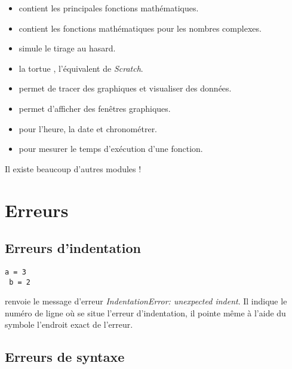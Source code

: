 \documentclass[11pt,class=report,crop=false]{standalone}
\begin{document}
\begin{itemize}
  \item {} \quad contient les principales fonctions mathématiques. 
  \item {} \quad contient les fonctions mathématiques pour les nombres complexes. 
  \item {} \quad simule le tirage au hasard.
  \item {} \quad la tortue \Python, l'équivalent de \emph{Scratch}.
  \item {} \quad permet de tracer des graphiques et visualiser des données.
  \item {} \quad permet d'afficher des fenêtres graphiques.
  \item {} \quad pour l'heure, la date et chronométrer.
  \item {} \quad pour mesurer le temps d’exécution d'une fonction.
  
\end{itemize}

Il existe beaucoup d'autres modules !



\section{Erreurs}

\subsection{Erreurs d'indentation}

\begin{lstlisting}
a = 3
 b = 2
\end{lstlisting}

\Python{} renvoie le message d'erreur \emph{IndentationError: unexpected indent}.
Il indique le numéro de ligne où se situe l'erreur d'indentation, il pointe même à l'aide du symbole \og{}\ci{\^}\fg{} l'endroit exact de l'erreur.

\subsection{Erreurs de syntaxe}
\end{document}
